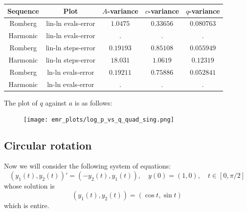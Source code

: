 \begin{table}[H]
    \centering
    \begin{tabular}{c|c||c|c|c}
Sequence & Plot & \(A\)-variance & \(c\)-variance & \(q\)-variance\\\hline
Romberg & lin-ln evals-error & \(1.0475\) & \(0.33656\) & \(0.080763\) \\
Harmonic & lin-ln evals-error & . & . & . \\
Romberg & lin-ln steps-error & \(0.19193\) & \(0.85108\) & \(0.055949\) \\
Harmonic & lin-ln steps-error & \(18.031\) & \(1.0619\) & \(0.12319\) \\
Romberg & ln-ln evals-error & \(0.19211\) & \(0.75886\) & \(0.052841\) \\
Harmonic & ln-ln evals-error & . & . & . \\
    \end{tabular}
    \label{tab:my_label}
\end{table}

The plot of \(q\) against \(a\) is as follows:

\begin{figure}[H]
\centering
\begin{minipage}{0.45\textwidth}
\centering
\texttt{[image: emr\_plots/log\_p\_vs\_q\_quad\_sing.png]}
\end{minipage}
\end{figure}

\subsection{Circular rotation}

Now we will consider the following system of equations:
\begin{equation}\label{48}
(y_1(t),y_2(t))' = (-y_2(t), y_1(t)), \quad y(0) = (1,0), \quad t\in [0,\pi /2]
\end{equation}
whose solution is 
\[
(y_1(t),y_2(t)) = (\cos t, \sin t)
\]
which is entire.

